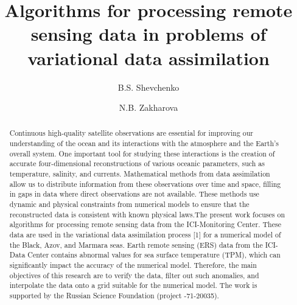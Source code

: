 \begin{englishtitle} %
\title{Algorithms for processing remote sensing data in problems of variational data assimilation}
\author{B.S. Shevchenko  \and  N.B. Zakharova
}

\maketitle

\begin{abstract}
Continuous high-quality satellite observations are essential for improving our understanding of the ocean and its interactions with the atmosphere and the Earth's overall system. One important tool for studying these interactions is the creation of accurate four-dimensional reconstructions of various oceanic parameters, such as temperature, salinity, and currents. Mathematical methods from data assimilation allow us to distribute information from these observations over time and space, filling in gaps in data where direct observations are not available. These methods use dynamic and physical constraints from numerical models to ensure that the reconstructed data is consistent with known physical laws.The present work focuses on algorithms for processing remote sensing data from the ICI-Monitoring Center. These data are used in the variational data assimilation process [1] for a numerical model of the Black, Azov, and Marmara seas. Earth remote sensing (ERS) data from the ICI-Data Center contains abnormal values for sea surface temperature (TPM), which can significantly impact the accuracy of the numerical model. Therefore, the main objectives of this research are to verify the data, filter out such anomalies, and interpolate the data onto a grid suitable for the numerical model.
The work is supported by the Russian Science Foundation (project -71-20035).
\end{abstract}
\end{englishtitle}

\iffalse
%
%


